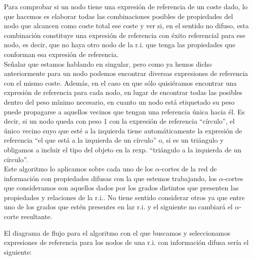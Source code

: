 \documentclass[10pt,a4paper]{article}
\begin{document}
Para comprobar si un nodo tiene una expresión de referencia de un coste dado, lo que hacemos es elaborar todas las combinaciones posibles de propiedades del nodo que alcancen como coste total ese coste y ver si, en el sentido no difuso, esta combinación constituye una expresión de referencia con éxito referencial para ese nodo, es decir, que no haya otro nodo de la r.i. que tenga las propiedades que conforman esa expresión de referencia.\\

Señalar que estamos hablando en singular, pero como ya hemos dicho anteriormente para un nodo podemos encontrar diversas expresiones de referencia con el mismo coste. Además, en el caso en que sólo quisiéramos encontrar una expresión de referencia para cada nodo, en lugar de encontrar todas las posibles dentro del peso mínimo necesario, en cuanto un nodo está etiquetado su peso puede propagarse a aquellos vecinos que tengan una referencia única hacia él. Es decir, si un nodo queda con peso 1 con la expresión de referencia ``círculo'', el único vecino suyo que esté a la izquierda tiene automáticamente la expresión de referencia ``el que está a la izquierda de un círculo'' o, si es un triángulo y obligamos a incluir el tipo del objeto en la rexp. ``triángulo a la izquierda de un círculo''.\\

Este algoritmo lo aplicamos sobre cada uno de los $\alpha$-cortes de la red de información con propiedades difusas con la que estemos trabajando, los $\alpha$-cortes que consideramos son aquellos dados por los grados distintos que presenten las propiedades y relaciones de la r.i.. No tiene sentido considerar otros ya que entre uno de los grados que estén presentes en lar r.i. y el siguiente no cambiará el $\alpha$-corte resultante.

El diagrama de flujo para el algoritmo con el que buscamos y seleccionamos expresiones de referencia para los nodos de una r.i. con información difusa sería el siguiente:
\end{document}
